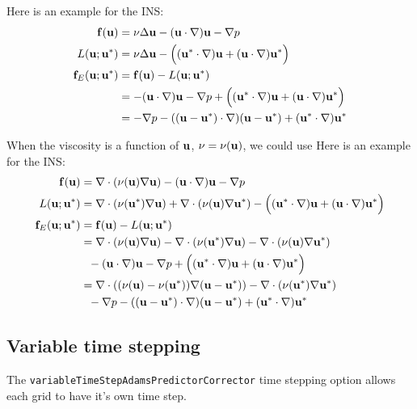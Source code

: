 Here is an example for the INS:
\begin{align*}
  \mathbf{ f}(\mathbf{ u}) & = \nu\Delta \mathbf{ u} - (\mathbf{ u}\cdot\nabla)\mathbf{ u} - \nabla p \\
  L(\mathbf{ u}; \mathbf{ u}^*) &= \nu\Delta \mathbf{ u} - \Big( (\mathbf{ u}^*\cdot\nabla)\mathbf{ u} + (\mathbf{ u}\cdot\nabla)\mathbf{ u}^*  \Big) \\
 \mathbf{ f}_E(\mathbf{ u};\mathbf{ u}^*) &= \mathbf{ f}(\mathbf{ u}) - L(\mathbf{ u}; \mathbf{ u}^*) \\
                 & = - (\mathbf{ u}\cdot\nabla)\mathbf{ u} - \nabla p + \Big( (\mathbf{ u}^*\cdot\nabla)\mathbf{ u} + (\mathbf{ u}\cdot\nabla)\mathbf{ u}^*  \Big)\\
    &= - \nabla p  - ((\mathbf{ u}-\mathbf{ u}^*)\cdot\nabla)(\mathbf{ u}-\mathbf{ u}^*) + (\mathbf{ u}^*\cdot\nabla)\mathbf{ u}^*
\end{align*}  

When the viscosity is a function of $\mathbf{ u}$, $\nu=\nu(\mathbf{ u})$, we could use
Here is an example for the INS:
\begin{align*}
  \mathbf{ f}(\mathbf{ u}) & = \nabla\cdot(\nu(\mathbf{ u})\nabla\mathbf{ u}) - (\mathbf{ u}\cdot\nabla)\mathbf{ u} - \nabla p \\
  L(\mathbf{ u}; \mathbf{ u}^*) &= \nabla\cdot(\nu(\mathbf{ u}^*)\nabla\mathbf{ u})  + \nabla\cdot(\nu(\mathbf{ u})\nabla\mathbf{ u}^*)
         - \Big( (\mathbf{ u}^*\cdot\nabla)\mathbf{ u} + (\mathbf{ u}\cdot\nabla)\mathbf{ u}^*  \Big) \\
 \mathbf{ f}_E(\mathbf{ u};\mathbf{ u}^*) &= \mathbf{ f}(\mathbf{ u}) - L(\mathbf{ u}; \mathbf{ u}^*)  \\
                 &= \nabla\cdot(\nu(\mathbf{ u})\nabla\mathbf{ u}) - \nabla\cdot(\nu(\mathbf{ u}^*)\nabla\mathbf{ u})  - \nabla\cdot(\nu(\mathbf{ u})\nabla\mathbf{ u}^*) \\
              & ~~- (\mathbf{ u}\cdot\nabla)\mathbf{ u} - \nabla p + \Big( (\mathbf{ u}^*\cdot\nabla)\mathbf{ u} + (\mathbf{ u}\cdot\nabla)\mathbf{ u}^*  \Big)\\
    &= \nabla\cdot((\nu(\mathbf{ u})-\nu(\mathbf{ u}^*))\nabla(\mathbf{ u}-\mathbf{ u}^*)) - \nabla\cdot(\nu(\mathbf{ u}^*)\nabla\mathbf{ u}^*) \\
        & ~~ - \nabla p  - ((\mathbf{ u}-\mathbf{ u}^*)\cdot\nabla)(\mathbf{ u}-\mathbf{ u}^*) + (\mathbf{ u}^*\cdot\nabla)\mathbf{ u}^*
\end{align*} 



\subsection{Variable time stepping}

 The {\tt variableTimeStepAdamsPredictorCorrector} time stepping option allows each grid to have
it's own time step. 

